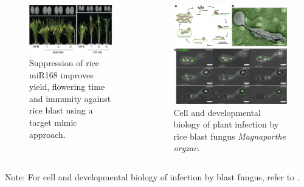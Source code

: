 \documentclass[10pt,dvipsnames,ignorenonframetext,aspectratio=169]{beamer}
\begin{document}
\begin{frame}{}
\protect\hypertarget{section-15}{}
\begin{columns}[T, onlytextwidth]

\begin{figure}
\includegraphics[width=0.9\linewidth]{../images/suppression_rice_miR168} \caption{Suppression of rice miR168 improves yield, flowering time and immunity against rice blast using a target mimic approach.}\label{fig:rice-blast-tolerance}
\end{figure}


\begin{figure}
\includegraphics[width=0.9\linewidth]{../images/biology_rice_blast_magnaporthe_infection} \caption{Cell and developmental biology of plant infection by rice blast fungus \textit{Magnaporthe oryzae}.}\label{fig:rice-blast-biology}
\end{figure}

\end{columns}

\footnotesize Note: For cell and developmental biology of infection by
blast fungus, refer to \citet{eseola2021investigating}.
\end{frame}
\end{document}
